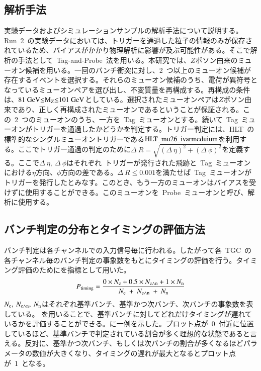 \subsection{解析手法}\label{subsec:tag}
実験データおよびシミュレーションサンプルの解析手法について説明する。
Run~2~の実験データにおいては、トリガーを通過した粒子の情報のみが保存されているため、バイアスがかかり物理解析に影響が及ぶ可能性がある。そこで解析の手法として~Tag-and-Probe~法を用いる。本研究では、$Z$ボソン由来のミューオン候補を用いる。一回のバンチ衝突に対し、2~つ以上のミューオン候補が存在するイベントを選択する。それらのミューオン候補のうち、電荷が異符号となっているミューオンペアを選び出し、不変質量を再構成する。再構成の条件は、$81~\rm{GeV}{\leq}M_{\it{Z}}{\leq}101~\rm{GeV}$としている。選択されたミューオンペアは$Z$ボソン由来であり、正しく再構成されたミューオンであるということが保証される。この~2~つのミューオンのうち、一方を~Tag~ミューオンとする。続いて~Tag~ミューオンがトリガーを通過したかどうかを判定する。トリガー判定には、HLT~の標準的なシングルミューオントリガーである$\rm{HLT\_mu26\_ivarmeduium}$を利用する。ここでトリガー通過の判定のために$\Delta~R=\sqrt{(\Delta~\eta)^2+(\Delta~\phi)^2}$を定義する。ここで$\Delta~\eta,~\Delta~\phi$はそれぞれ~トリガーが発行された飛跡と~Tag~ミューオンにおける$\eta$方向、$\phi$方向の差である。$\Delta~R{\leq}0.001$を満たせば~Tag~ミューオンがトリガーを発行したとみなす。このとき、もう一方のミューオンはバイアスを受けずに使用することができる。このミューオンを~Probe~ミューオンと呼び、解析に使用する。

\subsection{バンチ判定の分布とタイミングの評価方法}
バンチ判定は各チャンネルでの入力信号毎に行われる。したがって各~TGC~の各チャンネル毎のバンチ判定の事象数をもとにタイミングの評価を行う。タイミング評価のためにを指標として用いた。
\begin{align}
    \it{P_{\rm{timing}}}=\frac{\rm{0}\times\it{N_{\rm{c}}}+\rm{0.5}\times\it{N_{\rm{c{\land}n}}}+\rm{1}\times\it{N_{\rm{n}}}}{\it{N_{\rm{c}}}~+~\it{N_{\rm{c{\land}n}}}~+~\it{N_{\rm{n}}}} \label{eq:timing}
\end{align}
$\it{N_{\rm{c}}},~\it{N_{\rm{c{\land}n}}},~\it{N_{\rm{n}}}$はそれぞれ基準バンチ、基準かつ次バンチ、次バンチの事象数を表している。
を用いることで、基準バンチに対してどれだけタイミングが遅れているかを評価することができる。に一例を示した。プロット点が~0~付近に位置しているほど、基準バンチで判定されている割合が多く理想的な状態であると言える。反対に、基準かつ次バンチ、もしくは次バンチの割合が多くなるほどパラメータの数値が大きくなり、タイミングの遅れが最大となるとプロット点が~1~となる。

